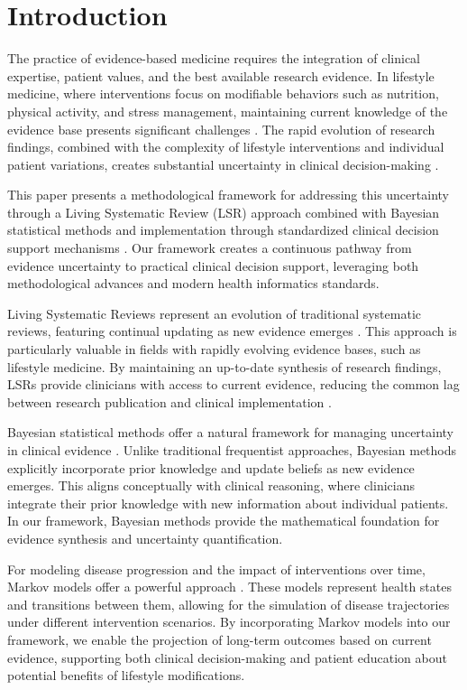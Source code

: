 \section{Introduction}

The practice of evidence-based medicine requires the integration of clinical expertise, patient values, and the best available research evidence. In lifestyle medicine, where interventions focus on modifiable behaviors such as nutrition, physical activity, and stress management, maintaining current knowledge of the evidence base presents significant challenges \cite{clayton2023foundations}. The rapid evolution of research findings, combined with the complexity of lifestyle interventions and individual patient variations, creates substantial uncertainty in clinical decision-making \cite{santos2024improving}.

This paper presents a methodological framework for addressing this uncertainty through a Living Systematic Review (LSR) approach combined with Bayesian statistical methods and implementation through standardized clinical decision support mechanisms \cite{santos2024healthcare}. Our framework creates a continuous pathway from evidence uncertainty to practical clinical decision support, leveraging both methodological advances and modern health informatics standards.

Living Systematic Reviews represent an evolution of traditional systematic reviews, featuring continual updating as new evidence emerges \cite{elliott2014living}. This approach is particularly valuable in fields with rapidly evolving evidence bases, such as lifestyle medicine. By maintaining an up-to-date synthesis of research findings, LSRs provide clinicians with access to current evidence, reducing the common lag between research publication and clinical implementation \cite{elliott2017living}.

Bayesian statistical methods offer a natural framework for managing uncertainty in clinical evidence \cite{spiegelhalter2004bayesian}. Unlike traditional frequentist approaches, Bayesian methods explicitly incorporate prior knowledge and update beliefs as new evidence emerges. This aligns conceptually with clinical reasoning, where clinicians integrate their prior knowledge with new information about individual patients. In our framework, Bayesian methods provide the mathematical foundation for evidence synthesis and uncertainty quantification.

For modeling disease progression and the impact of interventions over time, Markov models offer a powerful approach \cite{sonnenberg1993markov}. These models represent health states and transitions between them, allowing for the simulation of disease trajectories under different intervention scenarios. By incorporating Markov models into our framework, we enable the projection of long-term outcomes based on current evidence, supporting both clinical decision-making and patient education about potential benefits of lifestyle modifications.

